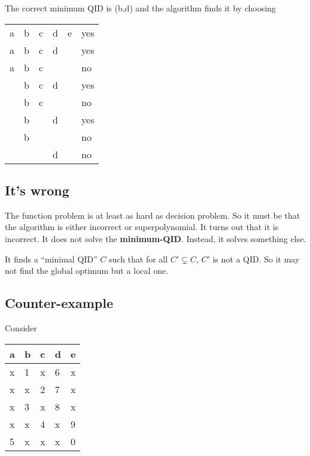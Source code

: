 \documentclass[12pt]{article}
\begin{document}
The correct minimum QID is (b,d) and the algorithm finds it by choosing
\begin{center}
    \begin{tabular}{ | M{3em} | M{3em} | M{3em} | M{3em} | M{3em} | M{3em} | }
    \hline
    a & b & c & d & e & yes\\
    a & b & c & d &   & yes\\
    a & b & c &   &   & no\\
      & b & c & d &   & yes\\
      & b & c &   &   & no\\
      & b &   & d &   & yes\\
      & b &   &   &   & no\\
      &   &   & d &   & no\\
    \hline
    \end{tabular}
\end{center}

\subsection*{It's wrong}
The function problem is at least as hard as decision problem. So it must be that the algorithm is either incorrect or superpolynomial. It turns out that it is incorrect. It does not solve the \textbf{minimum-QID}. Instead, it solves something else.

It finds a ``minimal QID'' $C$ such that for all $C' \subsetneq C$, $C'$ is not a QID. So it may not find the global optimum but a local one.

\newpage
\subsection*{Counter-example}
Consider
\begin{center}
    \begin{tabular}{ | M{3em} | M{3em} | M{3em} | M{3em} | M{3em} | }
    \hline
    a & b & c & d & e\\
    \hline
    x & 1 & x & 6 & x\\
    x & x & 2 & 7 & x\\
    x & 3 & x & 8 & x\\
    x & x & 4 & x & 9\\
    5 & x & x & x & 0\\
    \hline
    \end{tabular}
\end{center}
\end{document}
